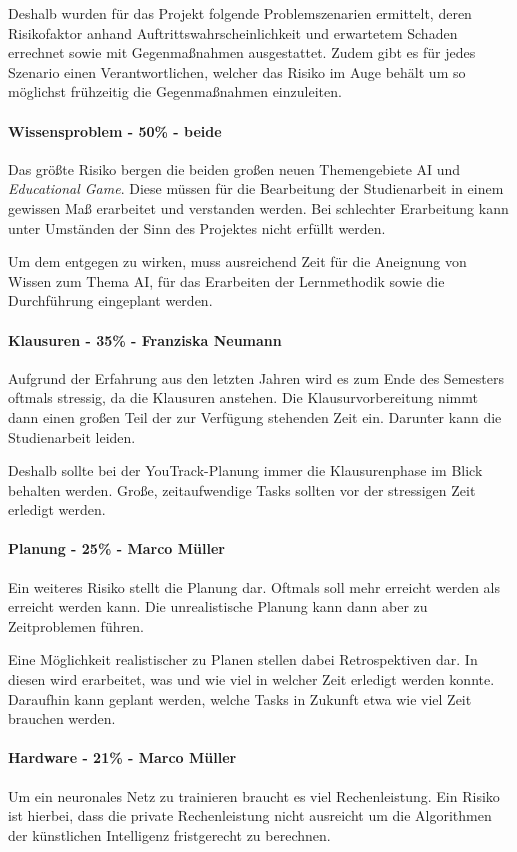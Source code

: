 Deshalb wurden für das Projekt folgende Problemszenarien ermittelt, deren Risikofaktor anhand Auftrittswahrscheinlichkeit und erwartetem Schaden errechnet sowie mit Gegenmaßnahmen ausgestattet. Zudem gibt es für jedes Szenario einen Verantwortlichen, welcher das Risiko im Auge behält um so möglichst frühzeitig die Gegenmaßnahmen einzuleiten. 

\paragraph{Wissensproblem - 50\% - beide}
Das größte Risiko bergen die beiden großen neuen Themengebiete AI und \textit{Educational Game}. Diese müssen für die Bearbeitung der Studienarbeit in einem gewissen Maß erarbeitet und verstanden werden. Bei schlechter Erarbeitung kann unter Umständen der Sinn des Projektes nicht erfüllt werden.

Um dem entgegen zu wirken, muss ausreichend Zeit für die Aneignung von Wissen zum Thema AI, für das Erarbeiten der Lernmethodik sowie die Durchführung eingeplant werden.

\paragraph{Klausuren - 35\% - Franziska Neumann}
Aufgrund der Erfahrung aus den letzten Jahren wird es zum Ende des Semesters oftmals stressig, da die Klausuren anstehen. Die Klausurvorbereitung nimmt dann einen großen Teil der zur Verfügung stehenden Zeit ein. Darunter kann die Studienarbeit leiden.

Deshalb sollte bei der YouTrack-Planung immer die Klausurenphase im Blick behalten werden. Große, zeitaufwendige Tasks sollten vor der stressigen Zeit erledigt werden.

\paragraph{Planung - 25\% - Marco Müller}
Ein weiteres Risiko stellt die Planung dar. Oftmals soll mehr erreicht werden als erreicht werden kann. Die unrealistische Planung kann dann aber zu Zeitproblemen führen. 

Eine Möglichkeit realistischer zu Planen stellen dabei Retrospektiven dar. In diesen wird erarbeitet, was und wie viel in welcher Zeit erledigt werden konnte. Daraufhin kann geplant werden, welche Tasks in Zukunft etwa wie viel Zeit brauchen werden.

\paragraph{Hardware - 21\% - Marco Müller}
Um ein neuronales Netz zu trainieren braucht es viel Rechenleistung. Ein Risiko ist hierbei, dass die private Rechenleistung nicht ausreicht um die Algorithmen der künstlichen Intelligenz fristgerecht zu berechnen. 

